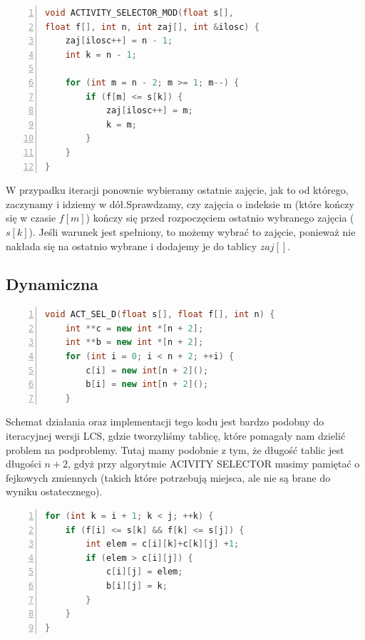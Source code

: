 \documentclass{article}
\begin{document}
\begin{lstlisting}[language=C++, caption={Kod funkcji rozwiazywania problemu przydziału sal w wersji zmodyfikowanej iteracji}, numbers=left, frame=single, xleftmargin=20pt]
void ACTIVITY_SELECTOR_MOD(float s[], 
float f[], int n, int zaj[], int &ilosc) {
	zaj[ilosc++] = n - 1;
	int k = n - 1;
	
	for (int m = n - 2; m >= 1; m--) {
		if (f[m] <= s[k]) {
			zaj[ilosc++] = m;
			k = m;
		}
	}
}
\end{lstlisting}

\large{W przypadku iteracji ponownie wybieramy ostatnie zajęcie, jak to od którego, zaczynamy i idziemy w dół.Sprawdzamy, czy zajęcia o indeksie m (które kończy się w czasie $f[m]$) kończy się przed rozpoczęciem ostatnio wybranego zajęcia ($s[k]$).
Jeśli warunek jest spełniony, to możemy wybrać to zajęcie, ponieważ nie nakłada się na ostatnio wybrane i dodajemy je do tablicy $zaj[]$.}


\subsection{Dynamiczna}

\begin{lstlisting}[language=C++, caption={Kod funkcji rozwiazywania problemu przydziału sal w wersji opartej o programowanie dynamiczne}, numbers=left, frame=single, xleftmargin=20pt]
void ACT_SEL_D(float s[], float f[], int n) {
	int **c = new int *[n + 2];
	int **b = new int *[n + 2];
	for (int i = 0; i < n + 2; ++i) {
		c[i] = new int[n + 2]();
		b[i] = new int[n + 2]();
	}
\end{lstlisting}

\large{Schemat działania oraz implementacji tego kodu jest bardzo podobny do iteracyjnej wersji LCS, gdzie tworzyliśmy tablicę, które pomagały nam dzielić problem na podproblemy. Tutaj mamy podobnie z tym, że długość tablic jest długości $n + 2$, gdyż przy algorytmie ACIVITY SELECTOR musimy pamiętać o fejkowych zmiennych (takich które potrzebują miejsca, ale nie są brane do wyniku ostatecznego).
}
\begin{lstlisting}[language=C++, caption={Kod funkcji rozwiazywania problemu przydziału sal w wersji opartej o programowanie dynamiczne}, numbers=left, frame=single, xleftmargin=20pt]
for (int k = i + 1; k < j; ++k) {
	if (f[i] <= s[k] && f[k] <= s[j]) {
		int elem = c[i][k]+c[k][j] +1;
		if (elem > c[i][j]) {
			c[i][j] = elem;
			b[i][j] = k;
		}
	}
}
\end{lstlisting}
\end{document}
